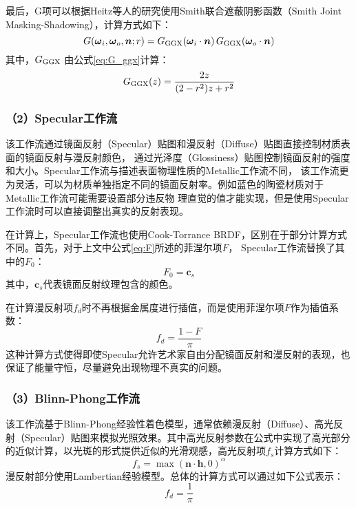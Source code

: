 最后，G项可以根据Heitz等人\cite{heitz2014understanding}的研究使用Smith联合遮蔽阴影函数（Smith Joint Masking-Shadowing），计算方式如下：
\begin{equation}
  \label{eq:G}
  G({\boldsymbol{\omega}}_i,{\boldsymbol{\omega}}_o,{\boldsymbol{n}};r)=G_{\rm{GGX}}({\boldsymbol{\omega}}_i\cdot{\boldsymbol{n}})\,G_{\rm{GGX}}({\boldsymbol{\omega}}_o\cdot{\boldsymbol{n}})
\end{equation}
其中，$G_{\rm{GGX}}$ 由公式\eqref{eq:G_ggx}计算：
\begin{equation}
  \label{eq:G_ggx}
  G_{\rm{GGX}}(z)=\frac{2z}{(2-r^2)z+r^2}
\end{equation}

\subsubsection*{（2）Specular工作流}

该工作流通过镜面反射（Specular）贴图和漫反射（Diffuse）贴图直接控制材质表面的镜面反射与漫反射颜色，
通过光泽度（Glossiness）贴图控制镜面反射的强度和大小。Specular工作流与描述表面物理性质的Metallic工作流不同，
该工作流更为灵活，可以为材质单独指定不同的镜面反射率。例如蓝色的陶瓷材质对于Metallic工作流可能需要设置部分违反物
理直觉的值才能实现，但是使用Specular工作流时可以直接调整出真实的反射表现。

在计算上，Specular工作流也使用Cook-Torrance BRDF，区别在于部分计算方式不同。首先，对于上文中公式\eqref{eq:F}所述的菲涅尔项$F$，
Specular工作流替换了其中的$F_0$：
\begin{equation}\label{eq:F0_spec}
F_0={\boldsymbol{c}}_s
\end{equation}
其中，${\boldsymbol{c}}_s$代表镜面反射纹理包含的颜色。

在计算漫反射项$f_d$时不再根据金属度进行插值，而是使用菲涅尔项$F$作为插值系数：
\begin{equation}\label{eq:diffuse_spec}
f_d=\frac{1-F}{\pi}
\end{equation}
  这种计算方式使得即使Specular允许艺术家自由分配镜面反射和漫反射的表现，也保证了能量守恒，尽量避免出现物理不真实的问题。

\subsubsection*{（3）Blinn-Phong工作流}

该工作流基于Blinn-Phong经验性着色模型，通常依赖漫反射（Diffuse）、高光反射（Specular）贴图来模拟光照效果。其中高光反射参数在公式中实现了高光部分的近似计算，以光斑的形式提供近似的光滑观感，高光反射项$f_s$计算方式如下：
\begin{equation}\label{eq:specular_BlinnPhong}
f_s=\max(\boldsymbol{n}\cdot \boldsymbol{h},0)^\alpha
\end{equation}
漫反射部分使用Lambertian经验模型。总体的计算方式可以通过如下公式表示：
\begin{equation}\label{eq:diffuse_BlinnPhong}
f_d=\frac{1}{\pi}
\end{equation}

